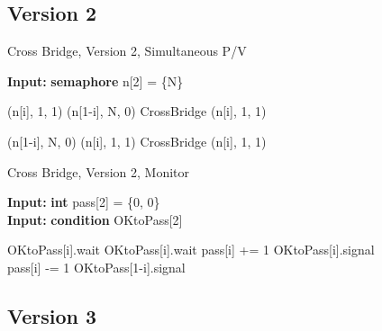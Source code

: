 \documentclass{article}
\renewcommand{\algorithmicrequire}{\textbf{Input: }}
\begin{document}
\subsection{Version 2}

\begin{algorithm}
  \caption{Cross Bridge, Version 2, Simultaneous P/V}
  \algorithmicrequire \textbf{semaphore} n[2] = \{N\} 

  \begin{algorithmic}
      \State \SP(n[i], 1, 1)
      \State \SP(n[1-i], N, 0)
      \State CrossBridge
      \State \SV(n[i], 1, 1)
    \EndProcedure

      \State \SP(n[1-i], N, 0)
      \State \SP(n[i], 1, 1)
      \State CrossBridge
      \State \SV(n[i], 1, 1)
    \EndProcedure
  \end{algorithmic}
\end{algorithm}


\begin{algorithm}
  \caption{Cross Bridge, Version 2, Monitor}
  \algorithmicrequire \textbf{int} pass[2] = \{0, 0\} \\
  \algorithmicrequire \textbf{condition} OKtoPass[2] \\

  \begin{algorithmic}
        \State OKtoPass[i].wait
      \EndIf
        \State OKtoPass[i].wait
      \EndIf
      \State pass[i] += 1
      \State OKtoPass[i].signal
    \EndProcedure
    \\
      \State pass[i] -= 1
        \State OKtoPass[1-i].signal
      \EndIf
    \EndProcedure
  \end{algorithmic}
\end{algorithm}

\subsection{Version 3}
\end{document}
